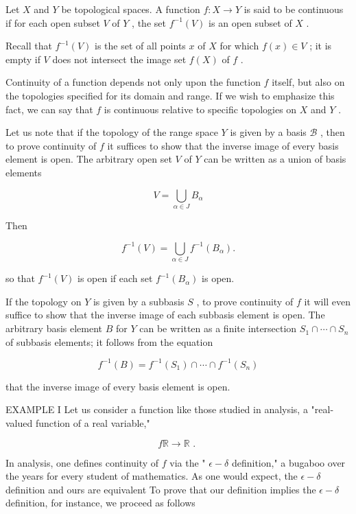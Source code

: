 Let \(X\) and \(Y\) be topological spaces. A function \(f : X \rightarrow  Y\) is said to be continuous if for each open subset \(V\) of \(Y\) , the set \({f}^{-1}\left( V\right)\) is an open subset of \(X\) .

Recall that \({f}^{-1}\left( V\right)\) is the set of all points \(x\) of \(X\) for which \(f\left( x\right)  \in  V\) ; it is empty if \(V\) does not intersect the image set \(f\left( X\right)\) of \(f\) .

Continuity of a function depends not only upon the function \(f\) itself, but also on the topologies specified for its domain and range. If we wish to emphasize this fact, we can say that \(f\) is continuous relative to specific topologies on \(X\) and \(Y\) .

Let us note that if the topology of the range space \(Y\) is given by a basis \(\mathcal{B}\) , then to prove continuity of \(f\) it suffices to show that the inverse image of every basis element is open. The arbitrary open set \(V\) of \(Y\) can be written as a union of basis elements

\[
V = \mathop{\bigcup }\limits_{{\alpha  \in  J}}{B}_{\alpha }
\]

Then

\[
{f}^{-1}\left( V\right)  = \mathop{\bigcup }\limits_{{\alpha  \in  J}}{f}^{-1}\left( {B}_{\alpha }\right) .
\]

so that \({f}^{-1}\left( V\right)\) is open if each set \({f}^{-1}\left( {B}_{\alpha }\right)\) is open.

If the topology on \(Y\) is given by a subbasis \(S\) , to prove continuity of \(f\) it will even suffice to show that the inverse image of each subbasis element is open. The arbitrary basis element \(B\) for \(Y\) can be written as a finite intersection \({S}_{1} \cap  \cdots  \cap  {S}_{n}\) of subbasis elements; it follows from the equation

\[
{f}^{-1}\left( B\right)  = {f}^{-1}\left( {S}_{1}\right)  \cap  \cdots  \cap  {f}^{-1}\left( {S}_{n}\right)
\]

that the inverse image of every basis element is open.

EXAMPLE I Let us consider a function like those studied in analysis, a "real-valued function of a real variable,"

\[
f\mathbb{R} \rightarrow  \mathbb{R}\text{ . }
\]

In analysis, one defines continuity of \(f\) via the " \(\epsilon  - \delta\) definition," a bugaboo over the years for every student of mathematics. As one would expect, the \(\epsilon  - \delta\) definition and ours are equivalent To prove that our definition implies the \(\epsilon  - \delta\) definition, for instance, we proceed as follows

